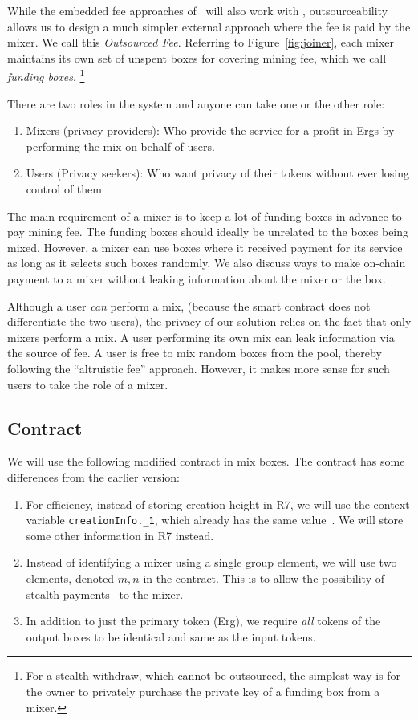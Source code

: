 \documentclass[runningheads]{llncs}
\begin{document}
While the embedded fee approaches of~\cite{zerojoin} will also work with \algname,
outsourceability allows us to design a much simpler external approach where the fee is paid by the mixer.
We call this {\em Outsourced Fee}. Referring to Figure~\ref{fig:joiner},
each mixer maintains its own set of unspent boxes for covering mining fee, which we call {\em funding boxes}.
\footnote{
For a stealth withdraw, which cannot be outsourced, the simplest way is for the owner to privately purchase the private key of a funding box from a mixer.}

There are two roles in the system and anyone can take one or the other role:
\begin{enumerate}
\item Mixers (privacy providers): Who provide the service for a profit in Ergs by performing the mix on behalf of users.
\item Users (Privacy seekers): Who want privacy of their tokens without ever losing control of them
\end{enumerate}

The main requirement of a mixer is to keep a lot of funding boxes in advance to pay mining fee.
The funding boxes should ideally be unrelated to the boxes being mixed. However, a mixer can use boxes where it received payment for its service as long as it selects such boxes randomly. We also discuss ways to make on-chain payment to a mixer without leaking information about the mixer or the box.

Although a user {\em can} perform a mix, (because the smart contract does not differentiate the two users), the privacy of our solution
relies on the fact that only mixers perform a mix. A user performing its own mix can leak information via the source of fee.
A user is free to mix random boxes from the pool, thereby following the ``altruistic fee'' approach. However, it makes more sense for such users to take the role of a mixer.


\subsection{Contract}

We will use the following modified contract in mix boxes. The contract has some differences from the earlier version:
\begin{enumerate}
\item For efficiency, instead of storing creation height in R7, we will use the context variable \texttt{creationInfo.\_1}, which already has the same value~\cite{ergo-data-model}.
We will store some other information in R7 instead.
\item Instead of identifying a mixer using a single group element, we will use two elements, denoted $m, n$ in the contract. This is to allow the possibility of stealth payments~\cite{stealth-payments} to the mixer.
\item In addition to just the primary token (Erg), we require {\em all} tokens of the output boxes to be identical and same as the input tokens.
\end{enumerate}
\end{document}
